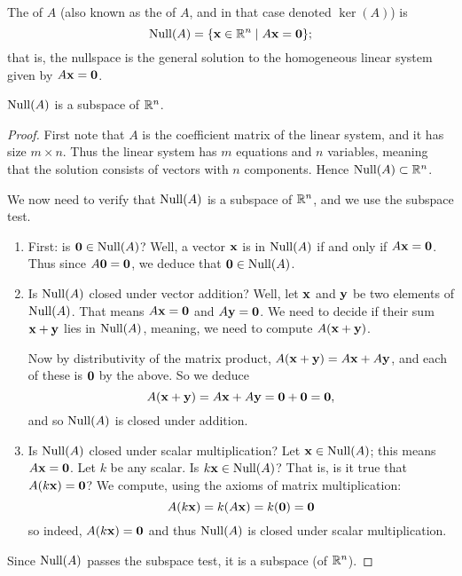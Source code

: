 \begin{definition}
The  of $A$ (also known as the  of $A$, and in that case denoted $\ker(A)$) is
$$
\operatorname{Null}(A) = \{ \mathbf{x} \in \mathbb{R}^n \mid A\mathbf{x} = \mathbf{0}\};
$$
that is, the nullspace is  the general solution to the homogeneous linear system given by $A\mathbf{x} = \mathbf{0}$.
\end{definition}

\begin{lemma}
$\operatorname{Null}(A)$ is a subspace of $\mathbb{R}^n$.
\end{lemma}

\begin{proof}
First note that $A$ is the coefficient matrix of the linear system, and it
has size $m \times n$.  Thus the linear system has $m$ equations and $n$
variables, meaning that the solution consists of vectors with $n$ components.
Hence $\operatorname{Null}(A) \subset \mathbb{R}^n$.  

We now need to verify that $\operatorname{Null}(A)$ is a subspace of $\mathbb{R}^n$, and we use
the subspace test.

\begin{enumerate}
\item First:  is $\mathbf{0} \in \operatorname{Null}(A)$?  Well, a vector $\mathbf{x}$ is in $\operatorname{Null}(A)$ if and only if $A\mathbf{x}=\mathbf{0}$.  Thus since $A\mathbf{0} = \mathbf{0}$, we deduce that $\mathbf{0} \in \operatorname{Null}(A)$.
\item Is $\operatorname{Null}(A)$ closed under vector addition?  Well, let $\mathbf{x}$ and $\mathbf{y}$ be two elements of $\operatorname{Null}(A)$.  That means $A\mathbf{x} = \mathbf{0}$ and 
$A\mathbf{y} = \mathbf{0}$.  We need to decide if their sum $\mathbf{x}+\mathbf{y}$ lies in
$\operatorname{Null}(A)$, meaning, we need to compute $A(\mathbf{x}+\mathbf{y})$.

Now by distributivity of the matrix product, $A(\mathbf{x}+\mathbf{y}) = A\mathbf{x}+A\mathbf{y}$, and each of these is $\mathbf{0}$ by the above.  So we deduce
$$
A(\mathbf{x}+\mathbf{y}) = A\mathbf{x}+A\mathbf{y} = \mathbf{0}+\mathbf{0}=\mathbf{0},
$$
and so $\operatorname{Null}(A)$ is closed under addition.

\item Is $\operatorname{Null}(A)$ closed under scalar multiplication?  Let $\mathbf{x}\in \operatorname{Null}(A)$; 
this means $A\mathbf{x} = \mathbf{0}$.  Let $k$ be any scalar.  Is $k\mathbf{x} \in \operatorname{Null}(A)$?  That is, is it true that $A(k\mathbf{x}) = \mathbf{0}$?  We compute, using
the axioms of matrix multiplication:
$$
A(k\mathbf{x}) = k(A\mathbf{x}) = k(\mathbf{0}) = \mathbf{0}
$$
so indeed, $A(k\mathbf{x}) = \mathbf{0}$ and thus $\operatorname{Null}(A)$ is closed under scalar multiplication.
\end{enumerate}
Since $\operatorname{Null}(A)$ passes the subspace test, it is a subspace (of $\mathbb{R}^n$).
\end{proof}

